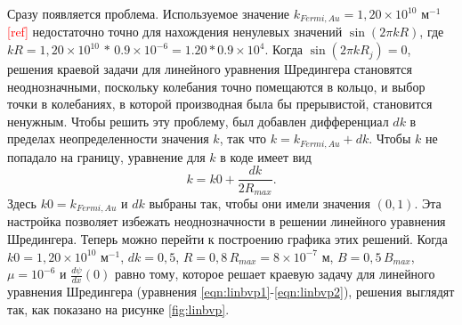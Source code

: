 \documentclass[A4,12pt,oneside]{article}
\renewcommand{\(}{\left(}
\renewcommand{\)}{\right)}
\newcommand{\citeph}{\textcolor{red}{[ref] }}
\begin{document}
Сразу появляется проблема. Используемое значение $k_{Fermi, Au} = 1,20 \times 10^{10}$ м$^{-1}$ \citeph недостаточно точно для нахождения ненулевых значений $\sin\left(2\pi k R\right)$, где $kR = 1,20 \times 10^{10}\, *\, 0.9 \times 10^{-6} = 1.20 * 0.9 \times 10^{4}$. Когда $\sin\left(2\pi k R_j\right)=0$, решения краевой задачи для линейного уравнения Шредингера становятся неоднозначными, поскольку колебания точно помещаются в кольцо, и выбор точки в колебаниях, в которой производная была бы прерывистой, становится ненужным. Чтобы решить эту проблему, был добавлен дифференциал $dk$ в пределах неопределенности значения $k$, так что $k = k_{Fermi, Au} + dk$. Чтобы $k$ не попадало на границу, уравнение для $k$ в коде имеет вид
\begin{equation}\label{eqn:fullk}
k = k0 + \frac{dk}{2 R_{max}}.
\end{equation}
Здесь $k0 = k_{Fermi, Au}$ и $dk$ выбраны так, чтобы они имели значения $(0, 1)$. Эта настройка позволяет избежать неоднозначности в решении линейного уравнения Шредингера. Теперь можно перейти к построению графика этих решений. Когда $k0 = 1,20 \times 10^{10}$ м$^{-1}$, $dk = 0,5$, $R = 0,8\, R_{max} = 8 \times 10^{-7}$ м, $B = 0,5\, B_{max}$, $\mu = 10^{-6}$ и $\frac{d\psi}{dx}\left(0\right)$ равно тому, которое решает краевую задачу для линейного уравнения Шредингера (уравнения \ref{eqn:linbvp1}-\ref{eqn:linbvp2}), решения выглядят так, как показано на рисунке \ref{fig:linbvp}.
\vspace{-1.3cm}
\end{document}
